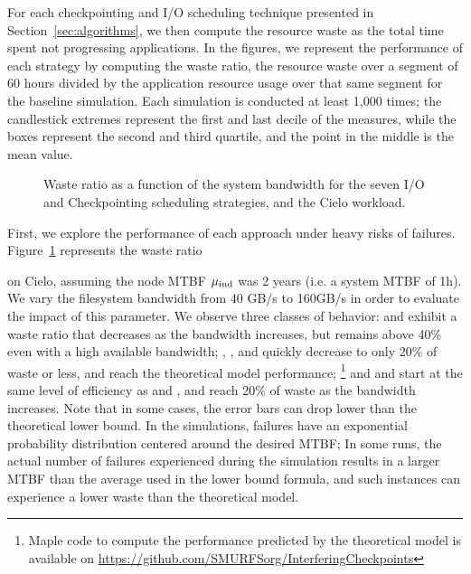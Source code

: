 For each checkpointing and I/O scheduling technique presented in
Section~\ref{sec:algorithms}, we then compute the resource waste as
the total time spent not progressing applications. In the figures, we
represent the performance of each strategy by computing the waste
ratio, \ie the resource waste over a segment of 60 hours divided by
the application resource usage over that same segment for the baseline
simulation. Each simulation is conducted at least 1,000 times; the
candlestick extremes represent the first and last decile of the
measures, while the boxes represent the second and third quartile, and
the point in the middle is the mean value.

\begin{figure}
  \begin{center}
    \resizebox{\linewidth}{!}{}
  \end{center}
  \caption{Waste ratio as a function of the system bandwidth for the
    seven I/O and Checkpointing scheduling strategies, and the Cielo
    workload. \label{fig:cielo-1hmtbf}}
\end{figure}

First, we explore the performance of each approach under heavy risks
of failures. Figure~\ref{fig:cielo-1hmtbf} represents the waste ratio

on Cielo, assuming the node MTBF $\mu_{\text{ind}}$ was 2 years (i.e. a system
MTBF of 1h). We vary the filesystem bandwidth from 40 GB/s to 160GB/s
in order to evaluate the impact of this parameter. We observe three
classes of behavior: \propfixed and \bfifofixed exhibit a waste ratio
that decreases as the bandwidth increases, but remains above 40\% even
with a high available bandwidth; \fifodaly, \fifofixed, and
\cooperative quickly decrease to only 20\% of waste or less, and reach
the theoretical model performance;
%
\footnote{Maple code to compute the
  performance predicted by the theoretical model is available on
  \url{https://github.com/SMURFSorg/InterferingCheckpoints}}
%
and \propdaly and \bfifodaly start at the same level of efficiency as
\propfixed and \bfifofixed, and reach 20\% of waste as the bandwidth
increases.
%
Note that in some cases, the error bars can drop lower than the theoretical
lower bound. In the simulations, failures have an exponential probability
distribution centered around the desired MTBF; In some runs, the actual
number of failures experienced during the simulation results in a larger
MTBF than the average used in the lower bound formula, and such instances
can experience a lower waste than the theoretical model. 

